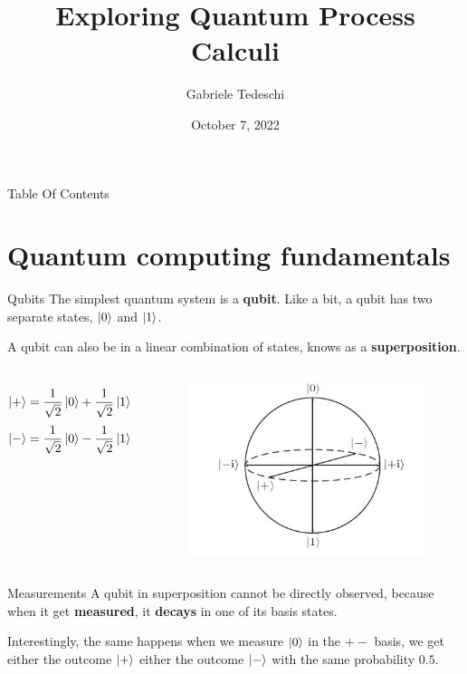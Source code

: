 \documentclass{beamer}
\title{Exploring Quantum Process Calculi}
\author{Gabriele Tedeschi}
\date{October 7, 2022}
\newcommand{\kz}{\ket{0}}
\newcommand{\ko}{\ket{1}}
\newcommand{\kpl}{\ket{+}}
\newcommand{\km}{\ket{-}}
\newcommand{\oost}{\frac{1}{\sqrt{2}}}
\begin{document}
\frame{\titlepage}

\begin{frame}{Table Of Contents}
\tableofcontents
\end{frame}

\section{Quantum computing fundamentals}
\begin{frame}{Qubits}
The simplest quantum system is a \textbf{qubit}. Like a bit, a qubit has two separate states, $\kz$ and $\ko$.

\pause
A qubit can also be in a linear combination of states, knows as a \textbf{superposition}.
\begin{columns}
\[ \kpl = \oost \kz + \oost \ko \]
\[\km = \oost \kz - \oost \ko \]

\begin{figure}
\includegraphics[scale=0.6]{bloch_no_bkg}
\end{figure} 
\end{columns}
\end{frame}



\begin{frame}{Measurements}
A qubit in superposition cannot be directly observed, because when it get \textbf{measured}, it \textbf{decays} in one of its basis states.
\pause
\bigskip


\bigskip
\pause
Interestingly, the same happens when we measure $\kz$ in the $+-$ basis, we get either the outcome $\kpl$ either the outcome $\km$ with the same probability $0.5$.
\end{frame}
\end{document}
